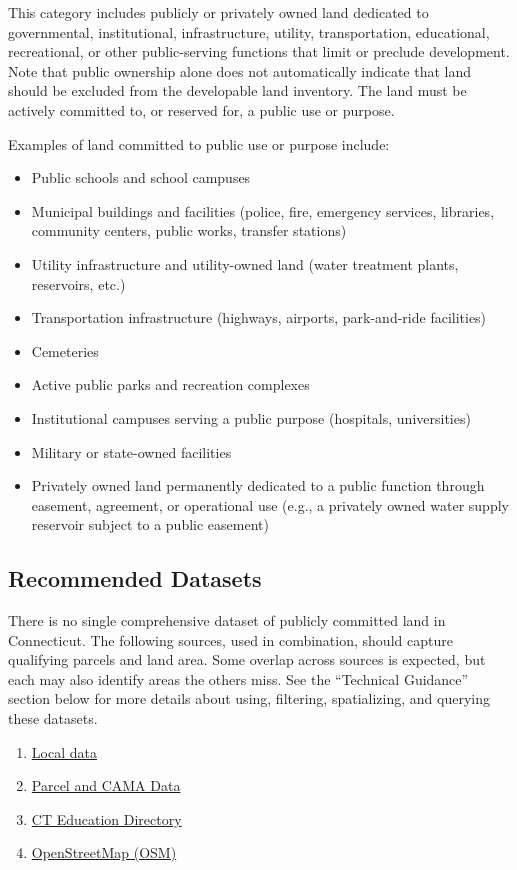\documentclass[
  letterpaper,
  DIV=11,
  numbers=noendperiod]{scrreprt}
\providecommand{\tightlist}{%
  \setlength{\itemsep}{0pt}\setlength{\parskip}{0pt}}
\begin{document}
This category includes publicly or privately owned land dedicated to
governmental, institutional, infrastructure, utility, transportation,
educational, recreational, or other public-serving functions that limit
or preclude development. Note that public ownership alone does not
automatically indicate that land should be excluded from the developable
land inventory. The land must be actively committed to, or reserved for,
a public use or purpose.

Examples of land committed to public use or purpose include:

\begin{itemize}
\tightlist
\item
  Public schools and school campuses
\item
  Municipal buildings and facilities (police, fire, emergency services,
  libraries, community centers, public works, transfer stations)
\item
  Utility infrastructure and utility-owned land (water treatment plants,
  reservoirs, etc.)
\item
  Transportation infrastructure (highways, airports, park-and-ride
  facilities)
\item
  Cemeteries
\item
  Active public parks and recreation complexes
\item
  Institutional campuses serving a public purpose (hospitals,
  universities)
\item
  Military or state-owned facilities
\item
  Privately owned land permanently dedicated to a public function
  through easement, agreement, or operational use (e.g., a privately
  owned water supply reservoir subject to a public easement)
\end{itemize}

\subsection{Recommended Datasets}\label{recommended-datasets}

There is no single comprehensive dataset of publicly committed land in
Connecticut. The following sources, used in combination, should capture
qualifying parcels and land area. Some overlap across sources is
expected, but each may also identify areas the others miss. See the
``Technical Guidance'' section below for more details about using,
filtering, spatializing, and querying these datasets.

\begin{enumerate}
\def\labelenumi{\arabic{enumi}.}
\tightlist
\item
  \hyperref[sec-local-data]{Local data}
\item
  \hyperref[sec-parcel-and-cama-data]{Parcel and CAMA Data}
\item
  \hyperref[sec-ct-education-directory]{CT Education Directory}
\item
  \hyperref[sec-openstreetmap]{OpenStreetMap (OSM)}
\end{enumerate}
\end{document}

